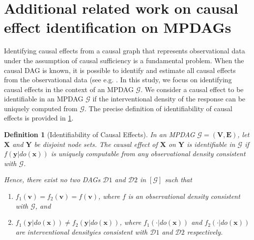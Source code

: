 \documentclass{article} %
\newtheorem{definition}{Definition}[section]
\begin{document}
\section{Additional related work on causal effect identification on MPDAGs} \label{Appendix: Additional related work on causal effect identification on MPDAGs}

Identifying causal effects from a causal graph that represents observational data under the assumption of causal sufficiency is a fundamental problem. When the causal DAG is known, it is possible to identify and estimate all causal effects from the observational data (see e.g. \cite{pearl1995causal, pearl1995probabilistic, robins1986new, galles1995testing}. In this study, we focus on identifying causal effects in the context of an MPDAG $\mathcal{G}$. We consider a causal effect to be identifiable in an MPDAG $\mathcal{G}$ if the interventional density of the response can be uniquely computed from $\mathcal{G}$. The precise definition of identifiability of causal effects is provided in \cref{def: Identifiability of Causal Effects}.

\begin{definition}[Identifiability of Causal Effects]\cite[Definition 3.1]{perkovic2020identifying} \label{def: Identifiability of Causal Effects}
    In an MPDAG $\mathcal{G}=(\mathbf{V}, \mathbf{E})$, let $\mathbf{X}$ and $\mathbf{Y}$ be disjoint node sets. The causal effect of $\mathbf{X}$ on $\mathbf{Y}$ is identifiable in $\mathcal{G}$ if $f(\mathbf{y}|do(\mathbf{x}))$ is uniquely computable from any observational density consistent with $\mathcal{G}$.

    Hence, there exist no two DAGs $\mathcal{D}1$ and $\mathcal{D}2$ in $[\mathcal{G}]$ such that 
    \begin{enumerate}
        \item $f_1(\mathbf{v})=f_2(\mathbf{v})=f(\mathbf{v})$, where $f$ is an observational density consistent with $\mathcal{G}$, and
        \item $f_1(\mathbf{y}|do(\mathbf{x})) \ne f_2(\mathbf{y}|do(\mathbf{x}))$, where $f_1(\cdot|do(\mathbf{x}))$ and $f_2(\cdot|do(\mathbf{x}))$ are interventional densityies consistent with $\mathcal{D}1$ and $\mathcal{D}2$ respectively.
    \end{enumerate}
\end{definition}
\end{document}
